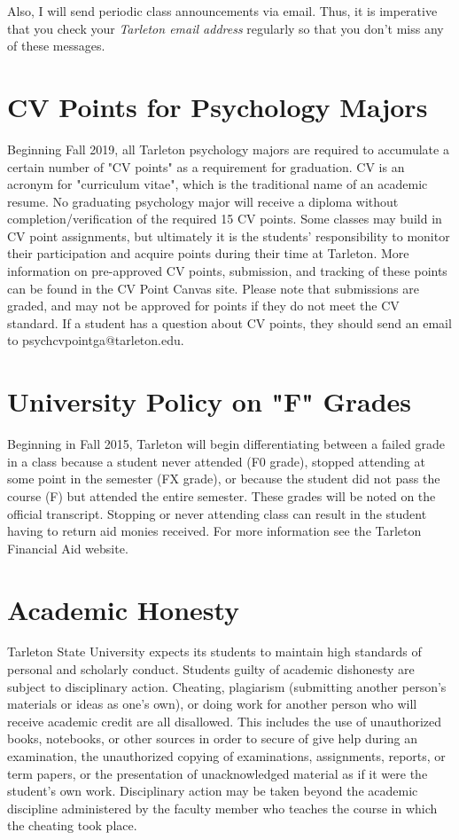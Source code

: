 \documentclass[10pt]{article}
\begin{document}
Also, I will send periodic class announcements via email.  Thus, it is imperative that you check your \emph{Tarleton email address} regularly so that you don't miss any of these messages.

\section*{CV Points for Psychology Majors}
\label{sec:orgfeb7610}
Beginning Fall 2019, all Tarleton psychology majors are required to accumulate a certain number of "CV points" as a requirement for graduation. CV is an acronym for "curriculum vitae", which is the traditional name of an academic resume.  No graduating psychology major will receive a diploma without completion/verification of the required 15 CV points. Some classes may build in CV point assignments, but ultimately it is the students’ responsibility to monitor their participation and acquire points during their time at Tarleton.  More information on pre-approved CV points, submission, and tracking of these points can be found in the CV Point Canvas site. Please note that submissions are graded, and may not be approved for points if they do not meet the CV standard.  If a student has a question about CV points, they should send an email to psychcvpointga@tarleton.edu.

\section*{University Policy on "F" Grades}
\label{sec:orgb64b36a}
Beginning in Fall 2015, Tarleton will begin differentiating between a failed grade in a class because a student never attended (F0 grade), stopped attending at some point in the semester (FX grade), or because the student did not pass the course (F) but attended the entire semester. These grades will be noted on the official transcript. Stopping or never attending class can result in the student having to return aid monies received.  For more information see the Tarleton Financial Aid website.
\section*{Academic Honesty}
\label{sec:orgc607386}

Tarleton State University expects its students to maintain high standards of personal and scholarly conduct. Students guilty of academic dishonesty are subject to disciplinary action. Cheating, plagiarism (submitting another person’s materials or ideas as one’s own), or doing work for another person who will receive academic credit are all disallowed. This includes the use of unauthorized books, notebooks, or other sources in order to secure of give help during an examination, the unauthorized copying of examinations, assignments, reports, or term papers, or the presentation of unacknowledged material as if it were the student’s own work. Disciplinary action may be taken beyond the academic discipline administered by the faculty member who teaches the course in which the cheating took place.
\end{document}
